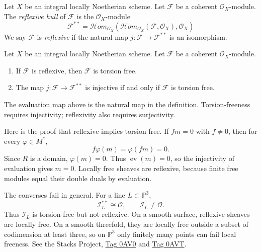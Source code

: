 \begin{definition}
\label{definition-reflexive}
Let $X$ be an integral locally Noetherian
scheme. Let $\mathcal{F}$
be a coherent $\mathcal{O}_X$-module.
The {\it reflexive hull}
of $\mathcal{F}$ is the
$\mathcal{O}_X$-module
$$
\mathcal{F}^{**}
=\mathcal{H}om_{\mathcal{O}_X}(
\mathcal{H}om_{\mathcal{O}_X}(\mathcal{F},
\mathcal{O}_X), \mathcal{O}_X)
$$
We say $\mathcal{F}$ is {\it reflexive}
if the natural map
$j : \mathcal{F} \longrightarrow
\mathcal{F}^{**}$
is an isomorphism.
\end{definition}

\begin{lemma}
\label{lemma-reflexive-torsion-free}
Let $X$ be an integral locally Noetherian
scheme. Let $\mathcal{F}$
be a coherent $\mathcal{O}_X$-module.
\begin{enumerate}
\item If $\mathcal{F}$ is reflexive, then
$\mathcal{F}$
is torsion free.
\item The map $j : \mathcal{F}
\longrightarrow \mathcal{F}^{**}$
is injective if and only if $\mathcal{F}$
is torsion free.
\end{enumerate}
\end{lemma}

The evaluation map above is the natural
map in the definition. Torsion-freeness
requires injectivity; reflexivity also
requires surjectivity.

Here is the proof that reflexive implies
torsion-free. If $fm=0$ with $f\ne0$,
then for every $\varphi\in M^*$,
$$
f\varphi(m)=\varphi(fm)=0.
$$
Since $R$ is a domain, $\varphi(m)=0$.
Thus $\operatorname{ev}(m)=0$, so the
injectivity of evaluation gives $m=0$.
Locally free sheaves are reflexive,
because finite free modules equal their
double duals by evaluation.

The converses fail in general.
For a line $L\subset\mathbb{P}^3$,
$$
\mathcal{I}_L^{**}\cong\mathcal{O},
\qquad \mathcal{I}_L\ne\mathcal{O}.
$$
Thus $\mathcal{I}_L$ is torsion-free
but not reflexive.
On a smooth surface, reflexive sheaves
are locally free. On a smooth threefold,
they are locally free outside a subset
of codimension at least three, so on
$\mathbb{P}^3$ only finitely many points
can fail local freeness.
See the Stacks Project,
\href{%
https://stacks.math.columbia.edu/tag/0AV0%
}{Tag 0AV0} and
\href{%
https://stacks.math.columbia.edu/tag/0AVT%
}{Tag 0AVT}.

